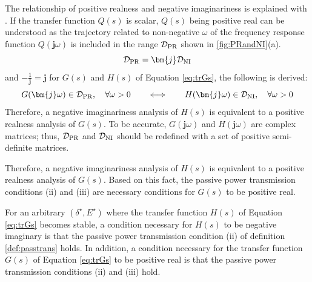 \documentclass[tombow,dvipdfmx]{corona-a5-1.1}
\begin{document}
The relationship of positive realness and negative imaginariness is explained with .
If the transfer function $Q(s)$ is scalar, $Q(s)$ being positive real can be understood as the trajectory related to non-negative $\omega$ of the frequency response function $Q(\bm{j} \omega)$ is included in the range $\mathcal{D}_{\rm PR}$ shown in \ref{fig:PRandNI}(a).
\[
\mathcal{D}_{\rm PR} = \bm{j} \mathcal{D}_{\rm NI}
\]
and $-\tfrac{1}{\bm{j}}=\bm{j}$ for $G(s)$ and $H(s)$ of Equation \ref{eq:trGs}, the following is derived:
\[
G(\bm{j} \omega) \in \mathcal{D}_{\rm PR}, 
\quad \forall \omega >0
\qquad
\Longleftrightarrow
\qquad
H(\bm{j} \omega) \in \mathcal{D}_{\rm NI} ,
\quad \forall \omega >0
\]
Therefore, a negative imaginariness analysis of $H(s)$ is equivalent to a positive realness analysis of $G(s)$.
To be accurate, $G(\bm{j} \omega)$ and $H(\bm{j} \omega)$ are complex matrices; thus, $\mathcal{D}_{\rm PR}$ and $\mathcal{D}_{\rm NI}$ should be redefined with a set of positive semi-definite matrices.

Therefore, a negative imaginariness analysis of $H(s)$ is equivalent to a positive realness analysis of $G(s)$. Based on this fact, the passive power transmission conditions (ii) and (iii) are necessary conditions for $G(s)$ to be positive real.

\begin{定理}
\label{thm:EdynNI}
For an arbitrary $(\delta^{\star},E^{\star})$ where the transfer function $H(s)$ of Equation \ref{eq:trGs} becomes stable, a condition necessary for $H(s)$ to be negative imaginary is that the passive power transmission condition (ii) of definition \ref{def:passtrans} holds.
In addition, a condition necessary for the transfer function $G(s)$ of Equation \ref{eq:trGs} to be positive real is that the passive power transmission conditions (ii) and (iii) hold.
\end{定理}
\end{document}
